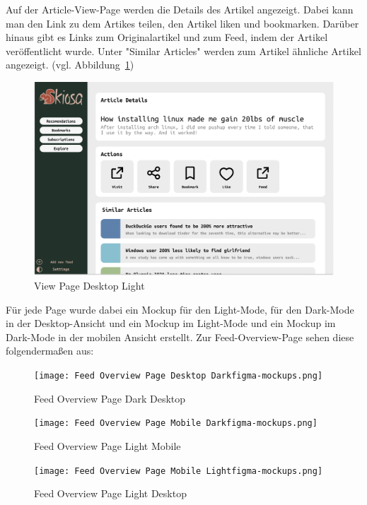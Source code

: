Auf der Article-View-Page werden die Details des Artikel angezeigt. Dabei kann man den Link zu dem Artikes teilen, den Artikel liken und bookmarken. 
Darüber hinaus gibt es Links zum Originalartikel und zum Feed, indem der Artikel veröffentlicht wurde. Unter "Similar Articles" werden zum Artikel ähnliche Artikel angezeigt. (vgl. Abbildung~\ref{fig:View Page Desktop Light})

\begin{figure}[H]
    \includegraphics[width=\linewidth]{images/View Page Desktop Lightfigma-mockups.png}
    \caption{View Page Desktop Light}
    \label{fig:View Page Desktop Light}
\end{figure}

Für jede Page wurde dabei ein Mockup für den Light-Mode, 
für den Dark-Mode in der Desktop-Ansicht und ein Mockup im 
Light-Mode und ein Mockup im Dark-Mode in der mobilen Ansicht 
erstellt. Zur Feed-Overview-Page sehen diese folgendermaßen aus:

\begin{figure}[H]
    \texttt{[image: Feed Overview Page Desktop Darkfigma-mockups.png]}
    \caption{Feed Overview Page Dark Desktop}
    \label{fig:Feed Overview Page Dark Desktop}
\end{figure}

\begin{figure}[H]
    \begin{center}
        \texttt{[image: Feed Overview Page Mobile Darkfigma-mockups.png]}
    \end{center}
    \caption{Feed Overview Page Light Mobile}
    \label{fig:Feed Overview Page Light Mobile}
\end{figure}


\begin{figure}[H]
    \begin{center}
        \texttt{[image: Feed Overview Page Mobile Lightfigma-mockups.png]}
    \end{center}
    \caption{Feed Overview Page Light Desktop}
    \label{fig:Feed Overview Page Light Mobile}
\end{figure}

